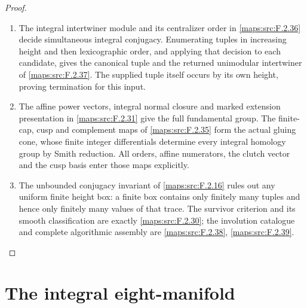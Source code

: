 \documentclass[11pt,a4paper]{article}
\theoremstyle{definition}
\begin{document}
\begin{proof}
\begin{enumerate}[label=\arabic*.]
\item The integral intertwiner module and its centralizer order in
\cref{maps:src:F.2.36} decide simultaneous integral conjugacy. Enumerating
tuples in increasing height and then lexicographic order, and applying
that decision to each candidate, gives the canonical tuple and the
returned unimodular intertwiner of \cref{maps:src:F.2.37}. The supplied
tuple itself occurs by its own height, proving termination for this input.
\item The affine power vectors, integral normal closure and marked
extension presentation in \cref{maps:src:F.2.31} give the full fundamental
group. The finite-cap, cusp and complement maps of
\cref{maps:src:F.2.35} form the actual gluing cone, whose finite integer
differentials determine every integral homology group by Smith reduction.
All orders, affine numerators, the clutch vector and the cusp basis enter
those maps explicitly.
\item The unbounded conjugacy invariant of \cref{maps:src:F.2.16}
rules out any uniform finite height box: a finite box contains only
finitely many tuples and hence only finitely many values of that trace.
The survivor criterion and its smooth classification are exactly
\cref{maps:src:F.2.30}; the involution catalogue and complete algorithmic
assembly are \cref{maps:src:F.2.38}, \cref{maps:src:F.2.39}.
\end{enumerate}
\end{proof}



\section{The integral eight-manifold}
\end{document}
